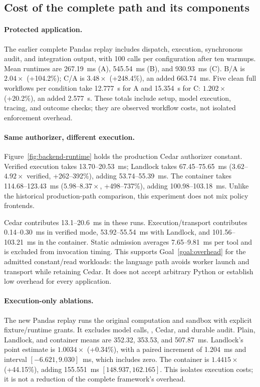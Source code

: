 \subsection{Cost of the complete path and its components}
\label{sec:cost}

\paragraph{Protected application.}
The earlier complete Pandas replay includes dispatch, execution, synchronous
audit, and integration output, with 100 calls per configuration after ten
warmups. Mean runtimes are 267.19~ms (A), 545.54~ms (B), and 930.93~ms (C).
B/A is $2.04\times$ (+104.2\%); C/A is $3.48\times$ (+248.4\%), an added
663.74~ms. Five clean full workflows per condition take 12.777~s for A and
15.354~s for C: $1.202\times$ (+20.2\%), an added 2.577~s. These totals include
setup, model execution, tracing, and outcome checks; they are observed workflow
costs, not isolated enforcement overhead.


\paragraph{Same authorizer, different execution.}
Figure~\ref{fig:backend-runtime} holds the production Cedar authorizer constant.
Verified execution takes 13.70--20.53~ms; Landlock takes 67.45--75.65~ms
($3.62$--$4.92\times$ verified, +262--392\%), adding 53.74--55.39~ms.
The container takes 114.68--123.43~ms ($5.98$--$8.37\times$, +498--737\%),
adding 100.98--103.18~ms. Unlike the historical production-path comparison,
this experiment does not mix policy frontends.


Cedar contributes 13.1--20.6~ms in these runs. Execution/transport contributes
0.14--0.30~ms in verified mode, 53.92--55.54~ms with Landlock, and
101.56--103.21~ms in the container. Static admission averages 7.65--9.81~ms
per tool and is excluded from invocation timing. This supports
Goal~\ref{goal:overhead} for the admitted constant/read workloads: the language
path avoids worker launch and transport while retaining Cedar. It does not
accept arbitrary Python or establish low overhead for every application.

\paragraph{Execution-only ablations.}
The new Pandas replay runs the original computation and sandbox with explicit
fixture/runtime grants. It excludes model calls, , Cedar, and
durable audit. Plain, Landlock, and container means are 352.32, 353.53, and
507.87~ms. Landlock's point estimate is $1.0034\times$ (+0.34\%), with a paired
increment of 1.204~ms and interval $[-6.621,9.030]$~ms, which includes zero.
The container is $1.4415\times$ (+44.15\%), adding 155.551~ms
$[148.937,162.165]$. This isolates execution costs; it is not a reduction of
the complete framework's overhead.

